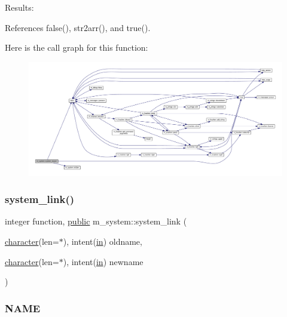 Results\+: 

References false(), str2arr(), and true().

Here is the call graph for this function\+:
\nopagebreak
\begin{figure}[H]
\begin{center}
\leavevmode
\includegraphics[width=350pt]{namespacem__system_af6eb5074fe74552bc7a5e7d00f459087_cgraph}
\end{center}
\end{figure}
\mbox{\label{namespacem__system_aa77d9c9ae68750f515ba3d04d022c43c}} 
\subsubsection{\texorpdfstring{system\+\_\+link()}{system\_link()}}
{\footnotesize\ttfamily integer function, \hyperlink{M__stopwatch_83_8txt_a2f74811300c361e53b430611a7d1769f}{public} m\+\_\+system\+::system\+\_\+link (\begin{DoxyParamCaption}\item[{\hyperlink{option__stopwatch_83_8txt_abd4b21fbbd175834027b5224bfe97e66}{character}(len=$\ast$), intent(\hyperlink{M__journal_83_8txt_afce72651d1eed785a2132bee863b2f38}{in})}]{oldname,  }\item[{\hyperlink{option__stopwatch_83_8txt_abd4b21fbbd175834027b5224bfe97e66}{character}(len=$\ast$), intent(\hyperlink{M__journal_83_8txt_afce72651d1eed785a2132bee863b2f38}{in})}]{newname }\end{DoxyParamCaption})}



\subsubsection*{N\+A\+ME}

